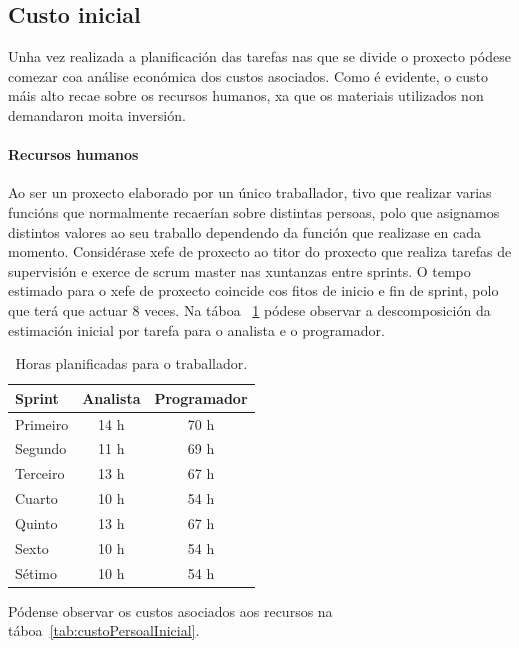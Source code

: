 \subsection{Custo inicial}
Unha vez realizada a planificación das tarefas nas que se divide o proxecto pódese comezar coa análise económica dos custos asociados. Como é evidente, o custo máis alto recae sobre os recursos humanos, xa que os materiais utilizados non demandaron moita inversión.

\paragraph{Recursos humanos}
Ao ser un proxecto elaborado por un único traballador, tivo que realizar varias funcións que normalmente recaerían sobre distintas persoas, polo que asignamos distintos valores ao seu traballo dependendo da función que realizase en cada momento. Considérase xefe de proxecto ao titor do proxecto que realiza tarefas de supervisión e exerce de scrum master nas xuntanzas entre sprints.
O tempo estimado para o xefe de proxecto coincide cos fitos de inicio e fin de sprint, polo que terá que actuar 8 veces.
Na táboa ~\ref{tab:horasTraballo} pódese observar a descomposición da estimación inicial por tarefa para o analista e o programador.

\begin{table} [tbh]
	\footnotesize
	\centering
	\begin{tabular}{|l|c|c|}
		\hline 
		\textbf{Sprint} & \textbf{Analista} & \textbf{Programador} \\ 
		\hline 
		Primeiro & 14 h & 70 h \\ 
		\hline 
		Segundo & 11 h & 69 h \\ 
		\hline 
		Terceiro & 13 h & 67 h \\ 
		\hline 
		Cuarto & 10 h & 54 h \\ 
		\hline 
		Quinto & 13 h & 67 h \\ 
		\hline 
		Sexto & 10 h & 54 h \\ 
		\hline 
		Sétimo & 10 h & 54 h \\ 
		\hline 
	\end{tabular}
	\caption{Horas planificadas para o traballador.}
	\label{tab:horasTraballo}
\end{table}

Pódense observar os custos asociados aos recursos na táboa~\ref{tab:custoPersoalInicial}.

